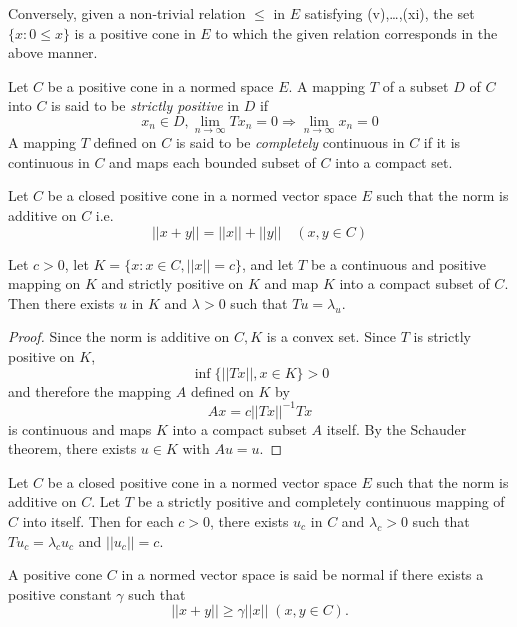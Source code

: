 Conversely, given a non-trivial relation $\leq$ in $E$ satisfying
(v),\ldots,(xi), the set $\{x : 0 \leq x \}$ is a positive cone in
$E$ to which the given relation corresponds in the above manner. 

\begin{Definition}%
  Let $C$ be a positive cone in a normed space $E$. A mapping $T$ of a
  subset $D$ of $C$ into $C$ is said to be {\em strictly positive} in
  $D$ if  
  $$
  x_n \in D, \lim_{n \to \infty} Tx_n =0\Rightarrow \lim_{n \to \infty} x_n =0
  $$ 
  A mapping $T$ defined on $C$ is said to be {\em completely}
  continuous in $C$ if it is continuous in $C$ and maps each bounded
  subset of $C$ into a compact set. 
\end{Definition}

\begin{thmm}%
  Let $C$ be a closed positive cone in a normed vector space $E$ such
  that the norm is additive on $C$ i.e. 
  $$
  || x + y || = || x || + || y || \quad (x,y \in C)
  $$
  
  Let $c > 0$, let $K= \{ x : x \in C, || x || = c \}$, and let $T$ be
  a continuous and positive mapping on $K$ and strictly positive on
  $K$ and map $K$ into a compact subset of $C$. Then there exists $u$
  in $K$ and $\lambda > 0$ such that $Tu = \lambda_u$.  
\end{thmm}

\begin{proof}
  Since the norm is additive on $C, K$ is a convex set. Since $T$ is
  strictly positive on $K$,  
  $$
  \inf \{ || Tx ||, x \in K\} > 0
  $$
  and therefore the mapping $A$ defined on $K$ by
  $$
  Ax = c || Tx ||^{-1} Tx
  $$\pageoriginale
  is continuous and maps $K$ into a compact subset $A$ itself. By
  the Schauder theorem, there exists $u \in K$ with $Au =u$. 
\end{proof}

\begin{coro*}%
  Let $C$ be a closed positive cone in a normed vector space $E$ such
  that the norm is additive on $C$. Let $T$ be a strictly  
  positive and completely continuous mapping of $C$ into itself. Then
  for each $c > 0$, there exists $u_c$ in $C$ and $\lambda_c > 0$ such
  that $Tu_c = \lambda_c u_c $ and $|| u_c || =c$. 
\end{coro*}

\begin{Definition}%
  A positive cone $C$ in a normed vector space is said be normal if
  there exists a positive constant $\gamma$ such that  
  $$
  || x + y || \geq \gamma || x ||\; (x,y\in C).
  $$
\end{Definition}

